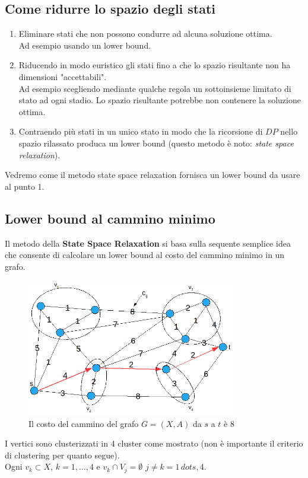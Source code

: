 \subsection{Come ridurre lo spazio degli stati}
\begin{enumerate}
	\item Eliminare stati che non possono condurre ad alcuna soluzione ottima.\\
	Ad esempio usando un lower bound.
	\item Riducendo in modo euristico gli stati fino a che lo spazio risultante non ha dimensioni "accettabili".\\
	Ad esempio scegliendo mediante qualche regola un sottoinsieme limitato di stato ad ogni stadio. Lo spazio risultante potrebbe non contenere la soluzione ottima.
	\item Contraendo più stati in un unico stato in modo che la ricorsione di $DP$ nello spazio rilassato produca un lower bound (questo metodo è noto: \textit{state space relaxation}).
\end{enumerate}

Vedremo come il metodo state space relaxation fornisca un lower bound da usare al punto 1.

\subsection{Lower bound al cammino minimo}
Il metodo della \textbf{State Space Relaxation} si basa sulla sequente semplice idea che consente di calcolare un lower bound al costo del cammino minimo in un grafo.
\begin{figure}[!h]
	\centering
	\includegraphics[height=6cm]{images/graph42.png}
	\caption{Il costo del cammino del grafo $G=(X,A)$ da $s$ a $t$ è 8}
\end{figure}
I vertici sono clusterizzati in 4 cluster come mostrato (non è importante il criterio di clustering per quanto segue).\\
Ogni $v_{k}\subset X$, $k=1,\dots,4$ e $v_{k}\cap V_{j}=\emptyset$ $j\neq k=1\,dots,4$.


